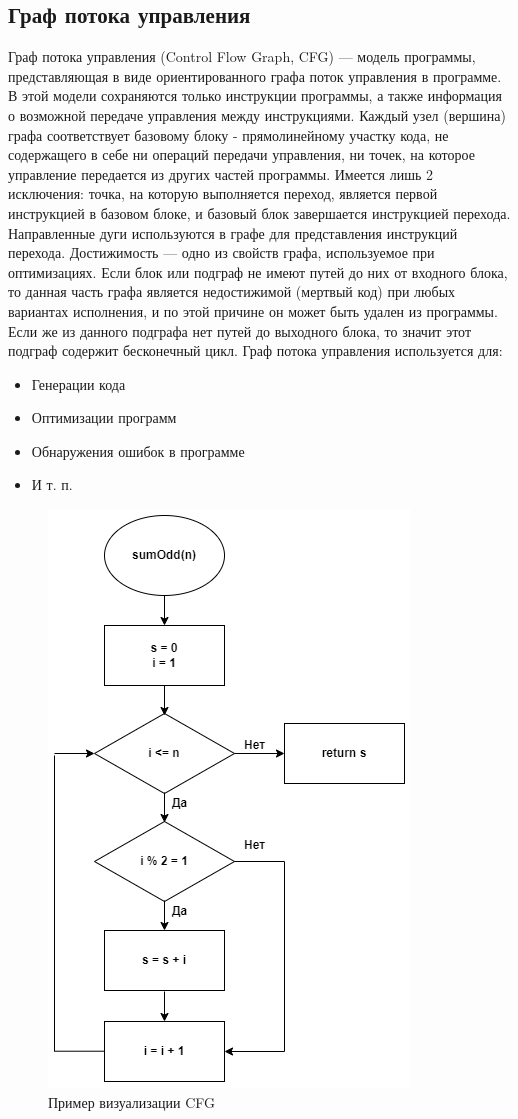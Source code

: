 \subsection{Граф потока управления} \label{ch1:subsec-title-abbr}
Граф потока управления (Control Flow Graph, CFG) — модель программы, представляющая в виде ориентированного графа поток управления в программе. В этой модели сохраняются только инструкции программы, а также информация о возможной передаче управления между инструкциями.
Каждый узел (вершина) графа соответствует базовому блоку - прямолинейному участку кода, не содержащего в себе ни операций передачи управления, ни точек, на которое управление передается из других частей программы. Имеется лишь 2 исключения: точка, на которую выполняется переход, является первой инструкцией в базовом блоке, и базовый блок завершается инструкцией перехода. Направленные дуги используются в графе для представления инструкций перехода. Достижимость — одно из свойств графа, используемое при оптимизациях. Если блок или подграф не имеют путей до них от входного блока, то данная часть графа является недостижимой (мертвый код) при любых вариантах исполнения, и по этой причине он может быть удален из программы. Если же из данного подграфа нет путей до выходного блока, то значит этот подграф содержит бесконечный цикл.
Граф потока управления используется для:
\begin{itemize}
\item Генерации кода 
\item Оптимизации программ 
\item Обнаружения ошибок в программе 
\item И т. п.
\end{itemize}
\begin{figure}[h]
	\center
	\includegraphics [scale=0.90] {my_folder/images/my/3}
	\caption{Пример визуализации CFG}
	\label{fig:3}  
\end{figure}
